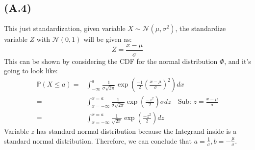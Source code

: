 \documentclass[]{article}
\begin{document}
    \subsection*{(A.4)}
        This just standardization, given variable $X\sim \mathcal{N}(\mu, \sigma^2)$, the standardize variable $Z$ with $\mathcal{N}(0, 1)$ will be given as: 
        \begin{equation*}\tag{1.4.1}\label{eqn:1.4.1}
            Z = \frac{x - \mu}{\sigma}
        \end{equation*}
        This can be shown by considering the CDF for the normal distribution $\Phi$, and it's going to look like: 
        \begin{align*}\tag{1.4.2}\label{eqn:1.4.2}
            \mathbb{P}\left(X \le a\right)
            =&
            \int_{-\infty}^{a} 
                \frac{1}{\sigma \sqrt{2\pi}} 
                \exp \left(
                    \frac{-1}{2}
                    \left(
                        \frac{x -\mu}{\sigma}
                    \right)^2
                \right)
            dx
            \\
            =& 
            \int_{x = -\infty}^{x = a} 
                \frac{1}{\sigma \sqrt{2\pi}}
                \exp\left(
                    \frac{-z^2}{2}
                \right)
            \sigma dz \quad \text{Sub: } z = \frac{x - \mu}{\sigma}
            \\
            =&
            \int_{x = -\infty}^{x = a} 
                \frac{1}{\sqrt{2\pi}}
                \exp\left(
                    \frac{-z^2}{2}
                \right)
            dz \quad
        \end{align*}
        Variable $z$ has standard normal distribution because the Integrand inside is a standard normal distribution. Therefore, we can conclude that $a = \frac{1}{\sigma}, b = -\frac{\mu}{\sigma}$. 
\end{document}
